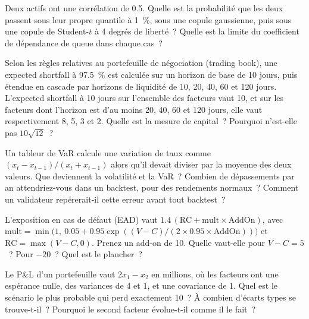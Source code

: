\begin{question}\label{iq:iv2:risk-validation-and-regulation:31}
Deux actifs ont une corrélation de 0.5. Quelle est la probabilité que les deux passent sous leur propre quantile à 1~\%, sous une copule gaussienne, puis sous une copule de Student-$t$ à 4 degrés de liberté~? Quelle est la limite du coefficient de dépendance de queue dans chaque cas~?
\end{question}

\begin{question}\label{iq:iv2:risk-validation-and-regulation:32}
Selon les règles relatives au portefeuille de négociation (trading book), une expected shortfall à 97.5~\% est calculée sur un horizon de base de 10 jours, puis étendue en cascade par horizons de liquidité de 10, 20, 40, 60 et 120 jours. L'expected shortfall à 10 jours sur l'ensemble des facteurs vaut 10, et sur les facteurs dont l'horizon est d'au moins 20, 40, 60 et 120 jours, elle vaut respectivement 8, 5, 3 et 2. Quelle est la mesure de capital~? Pourquoi n'est-elle pas $10\sqrt{12}$~?
\end{question}

\begin{question}\label{iq:iv2:risk-validation-and-regulation:33}
Un tableur de VaR calcule une variation de taux comme $(x_t - x_{t-1})/(x_t + x_{t-1})$ alors qu'il devait diviser par la moyenne des deux valeurs. Que deviennent la volatilité et la VaR~? Combien de dépassements par an attendriez-vous dans un backtest, pour des rendements normaux~? Comment un validateur repérerait-il cette erreur avant tout backtest~?
\end{question}

\begin{question}\label{iq:iv2:risk-validation-and-regulation:34}
L'exposition en cas de défaut (EAD) vaut $1.4\,(\mathrm{RC} + \mathrm{mult} \times \mathrm{AddOn})$, avec $\mathrm{mult} = \min\bigl(1,\ 0.05 + 0.95\exp((V - C)/(2 \times 0.95 \times \mathrm{AddOn}))\bigr)$ et $\mathrm{RC} = \max(V - C, 0)$. Prenez un add-on de 10. Quelle vaut-elle pour $V - C = 5$~? Pour $-20$~? Quel est le plancher~?
\end{question}

\begin{question}\label{iq:iv2:risk-validation-and-regulation:35}
Le P\&L d'un portefeuille vaut $2x_1 - x_2$ en millions, où les facteurs ont une espérance nulle, des variances de 4 et 1, et une covariance de 1. Quel est le scénario le plus probable qui perd exactement 10~? À combien d'écarts types se trouve-t-il~? Pourquoi le second facteur évolue-t-il comme il le fait~?
\end{question}

